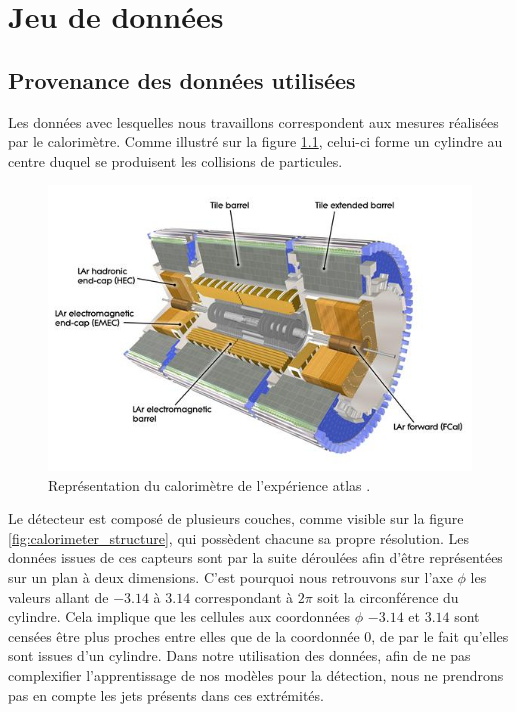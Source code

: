 
\chapter{Jeu de données} %

\label{Datasets} %


\section{Provenance des données utilisées}
\label{sec:dataset_origin}

Les données avec lesquelles nous travaillons correspondent aux mesures réalisées par le calorimètre. Comme illustré sur la figure \ref{fig:cern_calorimeter}, celui-ci forme un cylindre au centre duquel se produisent les collisions de particules.

\begin{figure}[hbt!]
    \centering
    \includegraphics[scale=0.4]{Figures/dataset/cern_calorimeter.jpg}
    \caption{Représentation du calorimètre de l'expérience \acrshort{atlas} \cite{noauthor_computer_nodate}.}
    \label{fig:cern_calorimeter}
\end{figure}

Le détecteur est composé de plusieurs couches, comme visible sur la figure \ref{fig:calorimeter_structure}, qui possèdent chacune sa propre résolution. Les données issues de ces capteurs sont par la suite déroulées afin d'être représentées sur un plan à deux dimensions. C'est pourquoi nous retrouvons sur l'axe $\phi$ les valeurs allant de $-3.14$ à $3.14$ correspondant à $2\pi$ soit la circonférence du cylindre. Cela implique que les cellules aux coordonnées $\phi$ $-3.14$ et $3.14$ sont censées être plus proches entre elles que de la coordonnée $0$, de par le fait qu'elles sont issues d'un cylindre. Dans notre utilisation des données, afin de ne pas complexifier l'apprentissage de nos modèles pour la détection, nous ne prendrons pas en compte les jets présents dans ces extrémités.

